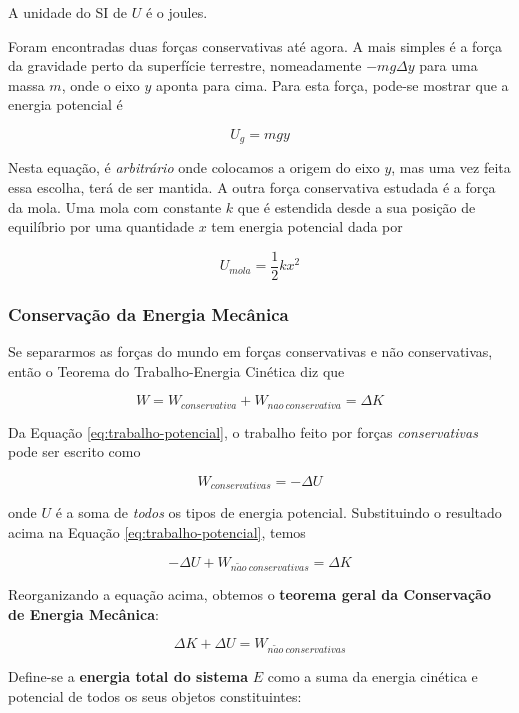 A unidade do SI de $U$ é o joules.

Foram encontradas duas forças conservativas até agora. A mais simples é a força da gravidade perto da superfície terrestre, nomeadamente $-mg\Delta y$ para uma massa $m$, onde o eixo $y$ aponta para cima. Para esta força, pode-se mostrar que a energia potencial é

\begin{equation}
    U_{g}=mgy
\end{equation}

Nesta equação, é \emph{arbitrário} onde colocamos a origem do eixo $y$, mas uma vez feita essa escolha, terá de ser mantida.
A outra força conservativa estudada é a força da mola. Uma mola com constante $k$ que é estendida desde a sua posição de equilíbrio por uma quantidade $x$ tem energia potencial dada por

\begin{equation}
    U_{mola}=\frac{1}{2}kx^2
\end{equation}

\subsubsection{Conservação da Energia Mecânica}
Se separarmos as forças do mundo em forças conservativas e não conservativas, então o Teorema do Trabalho-Energia Cinética diz que

\begin{equation}
    W=W_{conservativa}+W_{nao\ conservativa}=\Delta K
\end{equation}

Da Equação \ref{eq:trabalho-potencial}, o trabalho feito por forças \emph{conservativas} pode ser escrito como

$$
W_{conservativas}=-\Delta U
$$

onde $U$ é a soma de \emph{todos} os tipos de energia potencial. Substituindo o resultado acima na Equação \ref{eq:trabalho-potencial}, temos

$$
-\Delta U + W_{n\tilde{a}o\ conservativas}=\Delta K
$$

Reorganizando a equação acima, obtemos o \textbf{teorema geral da Conservação de Energia Mecânica}:

\begin{equation}\label{eq:conservação_em}
    \Delta K+\Delta U=W_{n\tilde{a}o\ conservativas}
\end{equation}

Define-se a \textbf{energia total do sistema} $E$ como a suma da energia cinética e potencial de todos os seus objetos constituintes:

